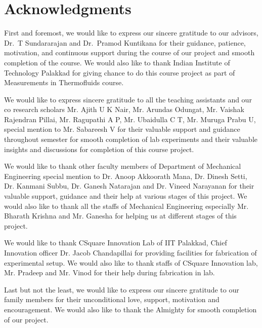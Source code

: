 \begingroup
\let\clearpage\relax
\let\cleardoublepage\relax
\let\cleardoublepage\relax
\chapter*{Acknowledgments}

First and foremost, we would like to express our sincere gratitude to our advisors, Dr.~T Sundararajan and Dr.~Pramod Kuntikana for their guidance, patience, motivation, and continuous support during the course of our project and smooth completion of the course. We would also like to thank Indian Institute of Technology Palakkad for giving chance to do this course project as part of Measurements in Thermofluids course.

We would like to express sincere gratitude to all the teaching assistants and our co research scholars Mr. Ajith U K Nair, Mr. Arundas Odungat, Mr. Vaishak Rajendran Pillai, Mr. Ragupathi A P, Mr. Ubaidulla C T, Mr. Muruga Prabu U, special mention to Mr. Sabareesh V for their valuable support and guidance throughout semester for smooth completion of lab experiments and their valuable insights and discussions for completion of this course project.

We would like to thank other faculty members of Department of Mechanical Engineering special mention to Dr. Anoop Akkoorath Mana, Dr. Dinesh Setti, Dr. Kanmani Subbu, Dr. Ganesh Natarajan and Dr. Vineed Narayanan for their valuable support, guidance and their help at various stages of this project. We would also like to thank all the staffs of Mechanical Engineering especially Mr. Bharath Krishna and  Mr. Ganesha for helping us at different stages of this project.

We would like to thank CSquare Innovation Lab of IIT Palakkad, Chief Innovation officer Dr. Jacob Chandapillai for providing facilities for fabrication of experimental setup. We would also like to thank staffs of CSquare Innovation lab, Mr. Pradeep and Mr. Vinod for their help during fabrication in lab.

Last but not the least, we would like to express our sincere gratitude to our family members for their unconditional love, support, motivation and encouragement. We would also like to thank the Almighty for smooth completion of our project.

\endgroup
